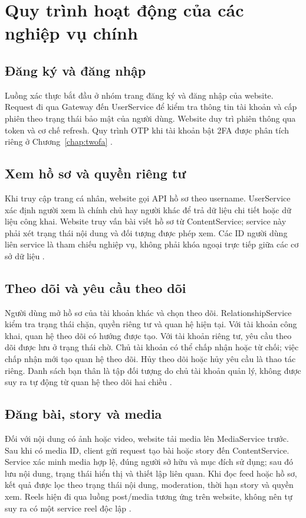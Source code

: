 \section{Quy trình hoạt động của các nghiệp vụ chính}
\subsection{Đăng ký và đăng nhập}
Luồng xác thực bắt đầu ở nhóm trang đăng ký và đăng nhập của website. Request đi qua Gateway đến UserService để kiểm tra thông tin tài khoản và cấp phiên theo trạng thái bảo mật của người dùng. Website duy trì phiên thông qua token và cơ chế refresh. Quy trình OTP khi tài khoản bật 2FA được phân tích riêng ở Chương~\ref{chap:twofa} \cite{architecture,usecases}.

\subsection{Xem hồ sơ và quyền riêng tư}
Khi truy cập trang cá nhân, website gọi API hồ sơ theo username. UserService xác định người xem là chính chủ hay người khác để trả dữ liệu chi tiết hoặc dữ liệu công khai. Website truy vấn bài viết hồ sơ từ ContentService; service này phải xét trạng thái nội dung và đối tượng được phép xem. Các ID người dùng liên service là tham chiếu nghiệp vụ, không phải khóa ngoại trực tiếp giữa các cơ sở dữ liệu \cite{architecture,catalog}.

\subsection{Theo dõi và yêu cầu theo dõi}
Người dùng mở hồ sơ của tài khoản khác và chọn theo dõi. RelationshipService kiểm tra trạng thái chặn, quyền riêng tư và quan hệ hiện tại. Với tài khoản công khai, quan hệ theo dõi có hướng được tạo. Với tài khoản riêng tư, yêu cầu theo dõi được lưu ở trạng thái chờ. Chủ tài khoản có thể chấp nhận hoặc từ chối; việc chấp nhận mới tạo quan hệ theo dõi. Hủy theo dõi hoặc hủy yêu cầu là thao tác riêng. Danh sách bạn thân là tập đối tượng do chủ tài khoản quản lý, không được suy ra tự động từ quan hệ theo dõi hai chiều \cite{relationship}.

\subsection{Đăng bài, story và media}
Đối với nội dung có ảnh hoặc video, website tải media lên MediaService trước. Sau khi có media ID, client gửi request tạo bài hoặc story đến ContentService. Service xác minh media hợp lệ, đúng người sở hữu và mục đích sử dụng; sau đó lưu nội dung, trạng thái hiển thị và thiết lập liên quan. Khi đọc feed hoặc hồ sơ, kết quả được lọc theo trạng thái nội dung, moderation, thời hạn story và quyền xem. Reels hiện đi qua luồng post/media tương ứng trên website, không nên tự suy ra có một service reel độc lập \cite{catalog}.

